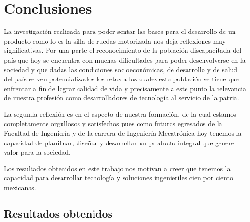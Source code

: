 
\chapter{Conclusiones} %

\label{Chapter5} %



La investigaci\'on realizada para poder sentar las bases para el desarrollo de un producto como lo es la silla de ruedas motorizada nos deja reflexiones muy significativas. Por una parte el reconocimiento de la poblaci\'on discapacitada del pa\'is que hoy se encuentra con muchas dificultades para poder desenvolverse en la sociedad y que dadas las condiciones socioecon\'omicas, de desarrollo y de salud del pa\'is se ven potencializados los retos a los cuales esta poblaci\'on se tiene que enfrentar a fin de lograr calidad de vida y precisamente a este punto la relevancia de nuestra profesi\'on como desarrolladores de tecnolog\'ia al servicio de la patria.

La segunda reflexi\'on es en el aspecto de nuestra formaci\'on, de la cual estamos completamente orgullosos y satisfechos pues como futuros egresados de la Facultad de Ingenier\'ia y de la carrera de Ingenier\'ia Mecatr\'onica hoy tenemos la capacidad de planificar, diseñar y desarrollar un producto integral que genere valor para la sociedad.

Los resultados obtenidos en este trabajo nos motivan a creer que tenemos la capacidad para desarrollar tecnolog\'ia y soluciones ingenieriles cien por ciento mexicanas.

\section{Resultados obtenidos}


